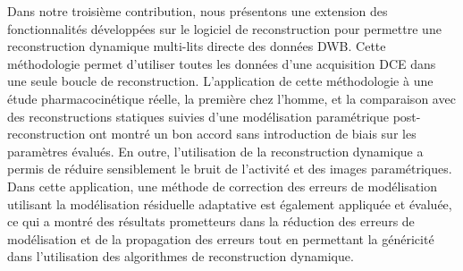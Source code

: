 {Dans notre troisième contribution, nous présentons une extension des fonctionnalités développées sur le logiciel de reconstruction pour permettre une reconstruction dynamique multi-lits directe des données DWB. Cette méthodologie permet d'utiliser toutes les données d'une acquisition DCE dans une seule boucle de reconstruction. L'application de cette méthodologie à une étude pharmacocinétique réelle, la première chez l'homme, et la comparaison avec des reconstructions statiques suivies d'une modélisation paramétrique post-reconstruction ont montré un bon accord sans introduction de biais sur les paramètres évalués. En outre, l'utilisation de la reconstruction dynamique a permis de réduire sensiblement le bruit de l'activité et des images paramétriques. 
Dans cette application, une méthode de correction des erreurs de modélisation utilisant la modélisation résiduelle adaptative est également appliquée et évaluée, ce qui a montré des résultats prometteurs dans la réduction des erreurs de modélisation et de la propagation des erreurs tout en permettant la généricité dans l'utilisation des algorithmes de reconstruction dynamique.}															%

